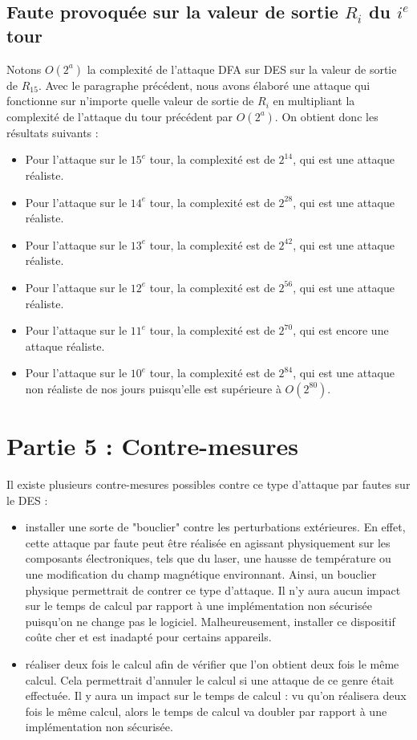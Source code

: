 \documentclass[11pt]{article}
\begin{document}
\subsection{Faute provoquée sur la valeur de sortie $R_{i}$ du $i^{e}$ tour}

Notons $O(2^a)$ la complexité de l'attaque DFA sur DES sur la valeur de sortie de $R_{15}$. Avec le paragraphe précédent, nous avons élaboré une attaque qui fonctionne sur n'importe quelle valeur de sortie de $R_i$ en multipliant la complexité de l'attaque du tour précédent par $O(2^a)$. On obtient donc les résultats suivants : 

\begin{itemize}
	\item Pour l'attaque sur le $15^e$ tour, la complexité est de $2^{14}$, qui est une attaque réaliste. 
	\item Pour l'attaque sur le $14^e$ tour, la complexité est de $2^{28}$, qui est une attaque réaliste. 
	\item Pour l'attaque sur le $13^e$ tour, la complexité est de $2^{42}$, qui est une attaque réaliste. 
	\item Pour l'attaque sur le $12^e$ tour, la complexité est de $2^{56}$, qui est une attaque réaliste. 
	\item Pour l'attaque sur le $11^e$ tour, la complexité est de $2^{70}$, qui est encore une attaque réaliste. 
	\item Pour l'attaque sur le $10^e$ tour, la complexité est de $2^{84}$, qui est une attaque non réaliste de nos jours puisqu'elle est supérieure à $O(2^{80})$. 
	
\end{itemize}

\section{Partie 5 : Contre-mesures}

Il existe plusieurs contre-mesures possibles contre ce type d'attaque par fautes sur le DES : 
\begin{itemize}
	\item installer une sorte de "bouclier" contre les perturbations extérieures. En effet, cette attaque par faute peut être réalisée en agissant physiquement sur les composants électroniques, tels que du laser, une hausse de température ou une modification du champ magnétique environnant. Ainsi, un bouclier physique permettrait de contrer ce type d'attaque. Il n'y aura aucun impact sur le temps de calcul par rapport à une implémentation non sécurisée puisqu'on ne change pas le logiciel. Malheureusement, installer ce dispositif coûte cher et est inadapté pour certains appareils. \newline
	
	\item réaliser deux fois le calcul afin de vérifier que l'on obtient deux fois le même calcul. Cela permettrait d'annuler le calcul si une attaque de ce genre était effectuée. Il y aura un impact sur le temps de calcul : vu qu'on réalisera deux fois le même calcul, alors le temps de calcul va doubler par rapport à une implémentation non sécurisée. 
\end{itemize}
\end{document}
